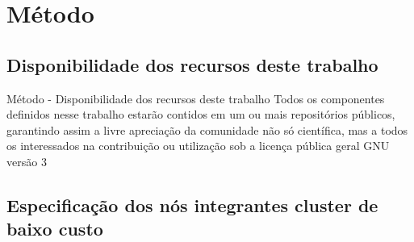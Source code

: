\documentclass[10pt,brazil]{beamer}
\theoremstyle{definition}
\begin{document}
\section{Método}

\subsection{Disponibilidade dos recursos deste trabalho}

\begin{frame}{Método - Disponibilidade dos recursos deste trabalho}
  Todos os componentes definidos nesse trabalho estarão contidos em um ou mais repositórios públicos, garantindo assim a livre apreciação da comunidade não só científica, mas a todos os interessados na contribuição ou utilização sob a licença pública geral GNU versão 3 %
\end{frame}

\subsection{Especificação dos nós integrantes cluster de baixo custo}
\end{document}
